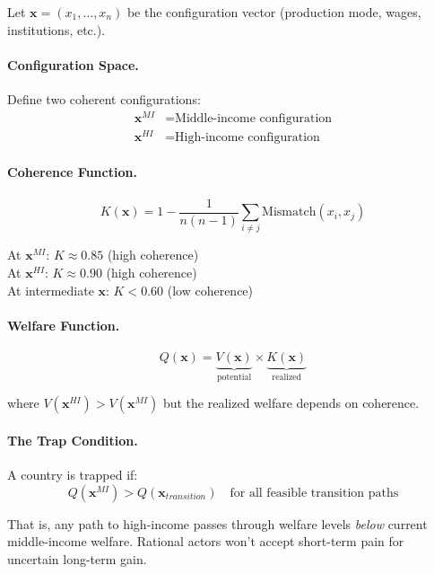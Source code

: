Let $\mathbf{x} = (x_1, \ldots, x_n)$ be the configuration vector (production 
mode, wages, institutions, etc.).

\paragraph{Configuration Space.}
Define two coherent configurations:
\begin{align}
\mathbf{x}^{MI} &= \text{Middle-income configuration} \\
\mathbf{x}^{HI} &= \text{High-income configuration}
\end{align}

\paragraph{Coherence Function.}
\begin{equation}
K(\mathbf{x}) = 1 - \frac{1}{n(n-1)} \sum_{i \neq j} \text{Mismatch}(x_i, x_j)
\end{equation}

At $\mathbf{x}^{MI}$: $K \approx 0.85$ (high coherence)\\
At $\mathbf{x}^{HI}$: $K \approx 0.90$ (high coherence)\\
At intermediate $\mathbf{x}$: $K < 0.60$ (low coherence)

\paragraph{Welfare Function.}
\begin{equation}
Q(\mathbf{x}) = \underbrace{V(\mathbf{x})}_{\text{potential}} \times \underbrace{K(\mathbf{x})}_{\text{realized}}
\end{equation}

where $V(\mathbf{x}^{HI}) > V(\mathbf{x}^{MI})$ but the realized welfare depends 
on coherence.

\paragraph{The Trap Condition.}
A country is trapped if:
\begin{equation}
Q(\mathbf{x}^{MI}) > Q(\mathbf{x}_{transition}) \quad \text{for all feasible transition paths}
\label{eq:trap-condition}
\end{equation}

That is, any path to high-income passes through welfare levels \emph{below} 
current middle-income welfare. Rational actors won't accept short-term pain 
for uncertain long-term gain.

